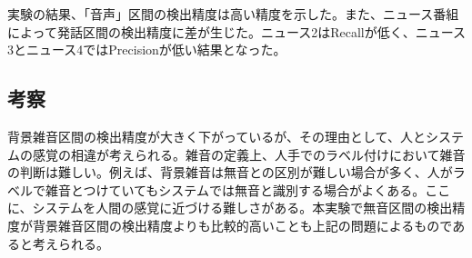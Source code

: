 実験の結果、「音声」区間の検出精度は高い精度を示した。また、ニュース番組によって発話区間の検出精度に差が生じた。ニュース2はRecallが低く、ニュース3とニュース4ではPrecisionが低い結果となった。

\subsection{考察}
背景雑音区間の検出精度が大きく下がっているが、その理由として、人とシステムの感覚の相違が考えられる。雑音の定義上、人手でのラベル付けにおいて雑音の判断は難しい。例えば、背景雑音は無音との区別が難しい場合が多く、人がラベルで雑音とつけていてもシステムでは無音と識別する場合がよくある。ここに、システムを人間の感覚に近づける難しさがある。本実験で無音区間の検出精度が背景雑音区間の検出精度よりも比較的高いことも上記の問題によるものであると考えられる。\par
